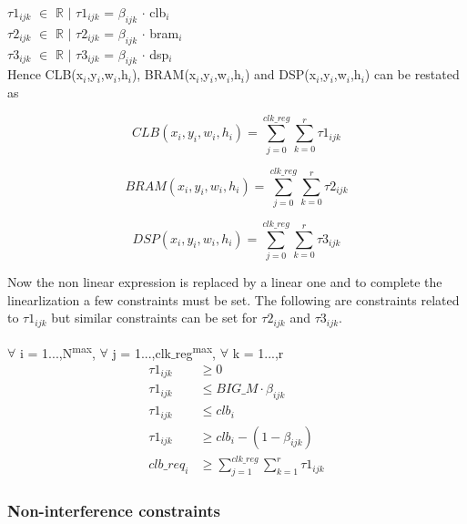 $\tau1_{ijk}$ $\in$ $\mathbb{R}$ $\mid$ $\tau1_{ijk}$ = $\beta_{ijk}$ $\cdot$ clb$_i$ \\

$\tau2_{ijk}$ $\in$ $\mathbb{R}$ $\mid$ $\tau2_{ijk}$ = $\beta_{ijk}$ $\cdot$ bram$_i$ \\

$\tau3_{ijk}$ $\in$ $\mathbb{R}$ $\mid$ $\tau3_{ijk}$ = $\beta_{ijk}$ $\cdot$ dsp$_i$ \\

Hence CLB(x$_i$,y$_i$,w$_i$,h$_i$), BRAM(x$_i$,y$_i$,w$_i$,h$_i$) and DSP(x$_i$,y$_i$,w$_i$,h$_i$) can be restated as 

\begin{equation}
CLB(x_i,y_i,w_i,h_i) = \sum_{j=0}^{clk\_reg} \sum_{k=0}^{r} \tau1_{ijk}
\end{equation}


\begin{equation}
BRAM(x_i,y_i,w_i,h_i) = \sum_{j=0}^{clk\_reg} \sum_{k=0}^{r} \tau2_{ijk}
\end{equation}

\begin{equation}
DSP(x_i,y_i,w_i,h_i) = \sum_{j=0}^{clk\_reg} \sum_{k=0}^{r} \tau3_{ijk}
\end{equation}

Now the non linear expression is replaced by a linear one and to complete the linearlization a few constraints must be set. The following are constraints related to $\tau1_{ijk}$ but similar constraints can be set for $\tau2_{ijk}$ and $\tau3_{ijk}$.

\begin{constraint} $\forall$ i = 1...,N\textsuperscript{max}, $\forall$ j = 1...,clk$\_$reg\textsuperscript{max}, $\forall$ k = 1...,r
\begin{equation}
\begin{split}
\tau1_{ijk} & \geq 0 \\
\tau1_{ijk} & \leq BIG\_M \cdot \beta_{ijk} \\ 
\tau1_{ijk} & \leq clb_i \\
\tau1_{ijk} & \geq clb_i - (1 - \beta_{ijk}) \\
clb\_req_i  & \geq \sum_{j=1}^{clk\_reg} \sum_{k=1}^{r} \tau1_{ijk}
\end{split}
\end{equation}
\end{constraint}


\subsubsection{\textbf{Non-interference constraints}}
